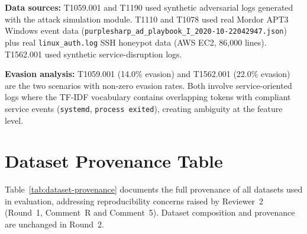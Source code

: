\documentclass[11pt,a4paper]{article}
\begin{document}
\noindent\textbf{Data sources:}
T1059.001 and T1190 used synthetic adversarial logs generated with the attack simulation
module. T1110 and T1078 used real Mordor APT3 Windows event data
(\texttt{purplesharp\_ad\_playbook\_I\_2020-10-22042947.json}) plus real
\texttt{linux\_auth.log} SSH honeypot data (AWS EC2, 86{,}000 lines).
T1562.001 used synthetic service-disruption logs.

\noindent\textbf{Evasion analysis:}
T1059.001 (14.0\% evasion) and T1562.001 (22.0\% evasion) are the two scenarios with
non-zero evasion rates. Both involve service-oriented logs where the TF-IDF vocabulary
contains overlapping tokens with compliant service events (\texttt{systemd}, \texttt{process
exited}), creating ambiguity at the feature level.

\section{Dataset Provenance Table}
\label{sec:dataset-provenance}

Table~\ref{tab:dataset-provenance} documents the full provenance of all datasets used in
evaluation, addressing reproducibility concerns raised by Reviewer~2 (Round~1, Comment~R
and Comment~5). Dataset composition and provenance are unchanged in Round~2.
\end{document}
